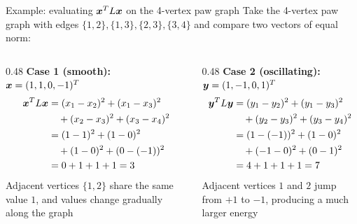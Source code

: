 \documentclass[aspectratio=169]{beamer}\usepackage[]{graphicx}\usepackage[]{xcolor}
\begin{document}
\begin{frame}{Example: evaluating $\bm{x}^T L \bm{x}$ on the 4-vertex paw graph}
Take the 4-vertex paw graph with edges $\{1, 2\}, \{1, 3\}, \{2, 3\}, \{3, 4\}$ and compare two vectors of equal norm:
\vfill
\begin{columns}[t]
\begin{column}{0.48\textwidth}
\textbf{Case 1 (smooth):} $\bm{x} = (1, 1, 0, -1)^T$
\begin{align*}
\bm{x}^T L \bm{x} &= (x_1 - x_2)^2 + (x_1 - x_3)^2 \\
&\quad + (x_2 - x_3)^2 + (x_3 - x_4)^2 \\
&= (1 - 1)^2 + (1 - 0)^2 \\
&\quad + (1 - 0)^2 + (0 - (-1))^2 \\
&= 0 + 1 + 1 + 1 = 3
\end{align*}
\footnotesize
Adjacent vertices $\{1, 2\}$ share the same value $1$, and values change gradually along the graph
\end{column}
\begin{column}{0.48\textwidth}
\textbf{Case 2 (oscillating):} $\bm{y} = (1, -1, 0, 1)^T$
\begin{align*}
\bm{y}^T L \bm{y} &= (y_1 - y_2)^2 + (y_1 - y_3)^2 \\
&\quad + (y_2 - y_3)^2 + (y_3 - y_4)^2 \\
&= (1 - (-1))^2 + (1 - 0)^2 \\
&\quad + (-1 - 0)^2 + (0 - 1)^2 \\
&= 4 + 1 + 1 + 1 = 7
\end{align*}
\footnotesize
Adjacent vertices $1$ and $2$ jump from $+1$ to $-1$, producing a much larger energy
\end{column}
\end{columns}
\end{frame}


\end{document}

